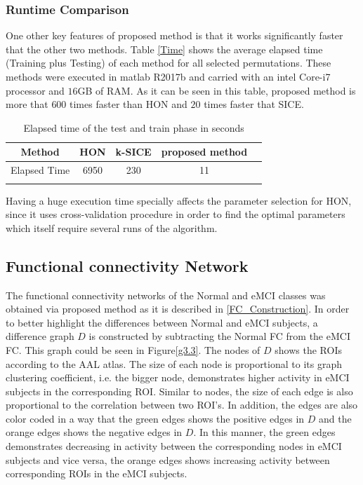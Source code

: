 \documentclass[preprint,12pt]{elsarticle}
\begin{document}
\subsubsection{Runtime Comparison}
One other key features of proposed method is that it works significantly faster that the other two methods. Table \eqref{Time} shows the average elapsed time (Training plus Testing) of each method for all selected permutations. These methods were executed in matlab R2017b and carried with an intel Core-i7 processor and $16$GB of RAM. As it can be seen in this table, proposed method is more that $600$ times faster than HON and $20$ times faster that SICE.   
\begin{table}
	\begin{center}
		\caption{Elapsed time of the test and train phase in seconds}
		\begin{tabular}{@{}c*{4}{c}}
			\hline\hline
			Method& HON & k-SICE& proposed method 
			\\
			\hline
			Elapsed Time  &6950& 230 & 11 
			\\
			\hline\hline
			\label{Time}
		\end{tabular}
	\end{center}
\end{table}
Having a huge execution time specially affects the parameter selection for HON, since it uses cross-validation procedure in order to find the optimal parameters which itself require several  runs of the algorithm. 




\subsection{Functional connectivity Network}
The functional connectivity networks of the Normal and eMCI classes was obtained via proposed method as it is described in \eqref{FC_Construction}.
In order to better highlight the differences between Normal and eMCI subjects, a difference graph $D$ is constructed by subtracting the Normal FC from the eMCI FC. This graph could be seen in Figure\eqref{g3.3}. 
The nodes of $D$ shows the ROIs according to the AAL atlas. The size of each node is proportional to its graph clustering coefficient, i.e. the bigger node, demonstrates higher activity in eMCI subjects in the corresponding ROI. 
Similar to nodes, the size of each edge is also proportional to the correlation between two ROI's. In addition, the edges are also color coded in a way that the green edges shows the positive edges in $D$ and the orange edges shows the negative edges in $D$. In this manner, the green edges demonstrates decreasing in activity between the corresponding nodes in eMCI subjects and vice versa, the orange edges shows increasing activity between corresponding ROIs in the eMCI subjects.   
\end{document}

